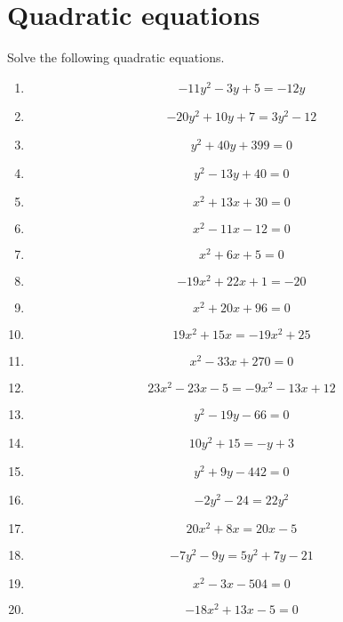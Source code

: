 \documentclass{article}
\begin{document}
        \section{Quadratic equations}
        Solve the following quadratic equations.
        \begin{multicols}{1}
        \begin{enumerate}
        \item $$- 11 y^{2} - 3 y + 5 = - 12 y$$
\item $$- 20 y^{2} + 10 y + 7 = 3 y^{2} - 12$$
\item $$y^{2} + 40 y + 399 = 0$$
\item $$y^{2} - 13 y + 40 = 0$$
\item $$x^{2} + 13 x + 30 = 0$$
\item $$x^{2} - 11 x - 12 = 0$$
\item $$x^{2} + 6 x + 5 = 0$$
\item $$- 19 x^{2} + 22 x + 1 = -20$$
\item $$x^{2} + 20 x + 96 = 0$$
\item $$19 x^{2} + 15 x = - 19 x^{2} + 25$$
\item $$x^{2} - 33 x + 270 = 0$$
\item $$23 x^{2} - 23 x - 5 = - 9 x^{2} - 13 x + 12$$
\item $$y^{2} - 19 y - 66 = 0$$
\item $$10 y^{2} + 15 = - y + 3$$
\item $$y^{2} + 9 y - 442 = 0$$
\item $$- 2 y^{2} - 24 = 22 y^{2}$$
\item $$20 x^{2} + 8 x = 20 x - 5$$
\item $$- 7 y^{2} - 9 y = 5 y^{2} + 7 y - 21$$
\item $$x^{2} - 3 x - 504 = 0$$
\item $$- 18 x^{2} + 13 x - 5 = 0$$
        \end{enumerate}
        \end{multicols}
        
\end{document}
